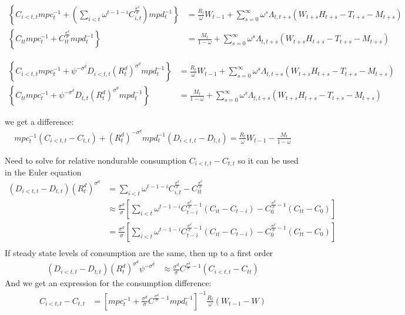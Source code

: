 \documentclass[11pt]{article}
\begin{document}
\begin{align*}
	\left\{C_{i<t,t} mpc_t^{-1} + \left(\sum_{i<t} \omega^{t-1-i} C_{i,t}^{\frac{\sigma^d}{\sigma}} \right) mpd_t^{-1}  \right\}&= \frac{R_{t}}{\omega} W_{t-1} + \sum_{s=0}^{\infty}\omega^s \Lambda_{t,t+s}(W_{t+s}H_{t+s} - T_{t+s}-M_{t+s}) \\
    \left\{C_{tt} mpc_t^{-1} +   C_{tt}^{\frac{\sigma^d}{\sigma}} mpd_t^{-1} \right\}&= \frac{M_{t}}{1-\omega} + \sum_{s=0}^{\infty}\omega^s \Lambda_{t,t+s}(W_{t+s}H_{t+s} - T_{t+s}-M_{t+s})
\end{align*}

\begin{align*}
	\left\{C_{i<t,t} mpc_t^{-1} + \psi^{-\sigma^d} D_{i<t,t}(R_{t}^d)^{\sigma^d} mpd_t^{-1}  \right\}&= \frac{R_{t}}{\omega} W_{t-1} + \sum_{s=0}^{\infty}\omega^s \Lambda_{t,t+s}(W_{t+s}H_{t+s} - T_{t+s}-M_{t+s}) \\
    \left\{C_{tt} mpc_t^{-1} + \psi^{-\sigma^d}  D_{t,t}(R_{t}^d)^{\sigma^d} mpd_t^{-1} \right\}&= \frac{M_{t}}{1-\omega} + \sum_{s=0}^{\infty}\omega^s \Lambda_{t,t+s}(W_{t+s}H_{t+s} - T_{t+s}-M_{t+s})
\end{align*}

we get a difference:
\begin{align*}
    mpc_t^{-1}(C_{i<t,t} - C_{t,t}) + (R_{t}^d)^{-\sigma^d} mpd_t^{-1}(D_{i<t,t} - D_{t,t}) = \frac{R_{t}}{\omega} W_{t-1} - \frac{M_{t}}{1-\omega}
\end{align*}

Need to solve for relative nondurable consumption $C_{i<t,t} - C_{t,t}$ so it can be used
in the Euler equation
\begin{align*}
    (D_{i<t,t} - D_{t,t})(R_{t}^d)^{\sigma^d} &= \sum_{i<t} \omega^{t-1-i} C_{i,t}^{\frac{\sigma^d}{\sigma}} - C_{tt}^{\frac{\sigma^d}{\sigma}} \\
    &\approx  \frac{\sigma^d}{\sigma}\left[\sum_{i<t} \omega^{t-1-i} C_{t-i}^{\frac{\sigma^d}{\sigma}-1}(C_{it} - C_{t-i}) - C_{0}^{\frac{\sigma^d}{\sigma}-1}(C_{tt} - C_{0}) \right] \\
    &=\frac{\sigma^d}{\sigma}\left[\sum_{i<t} \omega^{t-1-i} C_{t-i}^{\frac{\sigma^d}{\sigma}-1}(C_{it} - C_{t-i}) - C_{0}^{\frac{\sigma^d}{\sigma}-1}(C_{tt} - C_{0}) \right] \\
\end{align*}
If steady state levels of consumption are the same, then up to a first order
\begin{align*}
    (D_{i<t,t} - D_{t,t})(R_{t}^d)^{\sigma^d}\psi^{-\sigma^d}  &\approx  \frac{\sigma^d}{\sigma}C^{\frac{\sigma^d}{\sigma}-1} (C_{i<t,t} - C_{tt}) 
\end{align*}
And we get an expression for the consumption difference:
\begin{align*}
	C_{i<t,t} - C_{t,t} & = \left[ mpc_t^{-1} +   \frac{\sigma^d}{\sigma}C^{\frac{\sigma^d}{\sigma}-1} mpd_t^{-1}  \right]^{-1} \frac{R_{t}}{\omega}(  W_{t-1} - W )
\end{align*}
\end{document}
